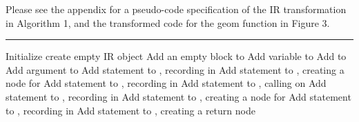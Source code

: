 Please see the appendix for a pseudo-code specification of the IR transformation in Algorithm 1, and
the transformed code for the geom function in Figure 3.

\begin{algorithm}[p]
  \hrule\footnotesize
  \begin{algorithmic}
    \State Initialize  \Comment create empty IR object
    \State Add an empty block  to 
    \State Add variable  to 
    \EndIf
    \State Add  to 
    \EndFor
    \State Add argument  to 
    \State Add statement to , recording  in 
    \EndIf
    \State Add statement  to , creating a node for 
    \State Add statement to , recording  in 
    \EndFor
    \State Add statement  to , calling  on 
    \State Add statement to , recording  in 
    \State Add statement  to , creating a node for 
    \State Add statement to , recording  in 
    \EndIf
    \EndFor
    \State Add statement  to , creating a return node

\end{algorithmic}
\end{algorithm}
